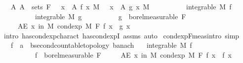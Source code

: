 \begin{isabellebody}
\ \ \ {\isachardoublequoteopen}{\isasymAnd}A{\isachardot}{\kern0pt}\ A\ {\isasymin}\ sets\ F\ {\isasymLongrightarrow}\ {\isacharparenleft}{\kern0pt}{\isasymintegral}\ x\ {\isasymin}\ A{\isachardot}{\kern0pt}\ f\ x\ {\isasympartial}M{\isacharparenright}{\kern0pt}\ {\isacharequal}{\kern0pt}\ {\isacharparenleft}{\kern0pt}{\isasymintegral}\ x\ {\isasymin}\ A{\isachardot}{\kern0pt}\ g\ x\ {\isasympartial}M{\isacharparenright}{\kern0pt}{\isachardoublequoteclose}\isanewline
\ \ \ \ \ \ \ \ \ \ {\isachardoublequoteopen}integrable\ M\ f{\isachardoublequoteclose}\isanewline
\ \ \ \ \ \ \ \ \ \ {\isachardoublequoteopen}integrable\ M\ g{\isachardoublequoteclose}\isanewline
\ \ \ \ \ \ \ \ \ \ {\isachardoublequoteopen}g\ {\isasymin}\ borel{\isacharunderscore}{\kern0pt}measurable\ F{\isachardoublequoteclose}\isanewline
\ \ \ \ \ {\isachardoublequoteopen}AE\ x\ in\ M{\isachardot}{\kern0pt}\ cond{\isacharunderscore}{\kern0pt}exp\ M\ F\ f\ x\ {\isacharequal}{\kern0pt}\ g\ x{\isachardoublequoteclose}\isanewline
%
\isadelimproof
\ \ %
\endisadelimproof
%
\isatagproof
{}\isamarkupfalse%
\ {\isacharparenleft}{\kern0pt}intro\ has{\isacharunderscore}{\kern0pt}cond{\isacharunderscore}{\kern0pt}exp{\isacharunderscore}{\kern0pt}charact\ has{\isacharunderscore}{\kern0pt}cond{\isacharunderscore}{\kern0pt}expI{\isacharprime}{\kern0pt}\ assms{\isacharparenright}{\kern0pt}\ auto%
\endisatagproof
{\isafoldproof}%
%
\isadelimproof
\isanewline
%
\endisadelimproof
\isanewline
{}\isamarkupfalse%
\ cond{\isacharunderscore}{\kern0pt}exp{\isacharunderscore}{\kern0pt}F{\isacharunderscore}{\kern0pt}meas{\isacharbrackleft}{\kern0pt}intro{\isacharcomma}{\kern0pt}\ simp{\isacharbrackright}{\kern0pt}{\isacharcolon}{\kern0pt}\isanewline
\ \ \ f\ {\isacharcolon}{\kern0pt}{\isacharcolon}{\kern0pt}\ {\isachardoublequoteopen}{\isacharprime}{\kern0pt}a\ {\isasymRightarrow}\ {\isacharprime}{\kern0pt}b{\isacharcolon}{\kern0pt}{\isacharcolon}{\kern0pt}{\isacharbraceleft}{\kern0pt}second{\isacharunderscore}{\kern0pt}countable{\isacharunderscore}{\kern0pt}topology{\isacharcomma}{\kern0pt}\ banach{\isacharbraceright}{\kern0pt}{\isachardoublequoteclose}\isanewline
\ \ \ {\isachardoublequoteopen}integrable\ M\ f{\isachardoublequoteclose}\isanewline
\ \ \ \ \ \ \ \ \ \ {\isachardoublequoteopen}f\ {\isasymin}\ borel{\isacharunderscore}{\kern0pt}measurable\ F{\isachardoublequoteclose}\isanewline
\ \ \ \ \ {\isachardoublequoteopen}AE\ x\ in\ M{\isachardot}{\kern0pt}\ cond{\isacharunderscore}{\kern0pt}exp\ M\ F\ f\ x\ {\isacharequal}{\kern0pt}\ f\ x{\isachardoublequoteclose}\isanewline

\end{isabellebody}
